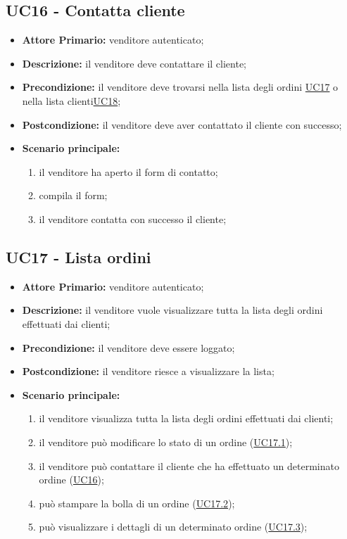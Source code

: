 \subsection{UC16 - Contatta cliente}
\label{UC16}
\begin{itemize}
    \item \textbf{Attore Primario:} venditore autenticato;
    \item \textbf{Descrizione:} il venditore deve contattare il cliente;
    \item \textbf{Precondizione:} il venditore deve trovarsi nella lista degli ordini \hyperref[UC17]{UC17} o nella lista clienti\hyperref[UC18]{UC18};
    \item \textbf{Postcondizione:} il venditore deve aver contattato il cliente con successo;
    \item \textbf{Scenario principale:}
    \begin{enumerate}
        \item il venditore ha aperto il form di contatto;
        \item compila il form;
        \item il venditore contatta con successo il cliente;
    \end{enumerate}
\end{itemize}

\subsection{UC17 - Lista ordini}
\label{UC17}
\begin{itemize}
    \item \textbf{Attore Primario:} venditore autenticato;
    \item \textbf{Descrizione:} il venditore vuole visualizzare tutta la lista degli ordini effettuati dai clienti;
    \item \textbf{Precondizione:} il venditore deve essere loggato;
    \item \textbf{Postcondizione:} il venditore riesce a visualizzare la lista;
    \item \textbf{Scenario principale:}
    \begin{enumerate}
        \item il venditore visualizza tutta la lista degli ordini effettuati dai clienti;
         \item il venditore può modificare lo stato di un ordine (\hyperref[UC17.1]{UC17.1});
        \item il venditore può contattare il cliente che ha effettuato un determinato ordine (\hyperref[UC16]{UC16});
        \item può stampare la bolla di un ordine (\hyperref[UC17.2]{UC17.2});
        \item può visualizzare i dettagli di un determinato ordine (\hyperref[UC17.3]{UC17.3}); 
    \end{enumerate}
\end{itemize}

